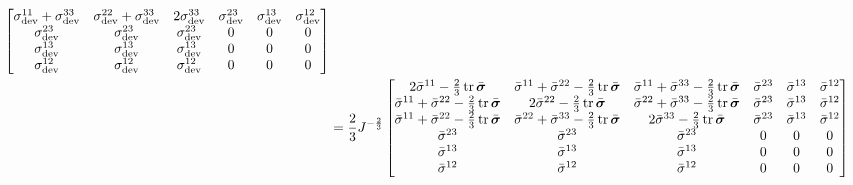 \begin{equation}
\begin{split}
\begin{bmatrix}
      \sigma_{\devop}^{11}+\sigma_{\devop}^{33} & \sigma_{\devop}^{22}+\sigma_{\devop}^{33} &
      2\sigma_{\devop}^{33} & \sigma_{\devop}^{23} &
      \sigma_{\devop}^{13} & \sigma_{\devop}^{12} \\
      \sigma_{\devop}^{23} & \sigma_{\devop}^{23} & \sigma_{\devop}^{23} & 0 &
      0 & 0 \\
      \sigma_{\devop}^{13} & \sigma_{\devop}^{13} & \sigma_{\devop}^{13} & 0 &
      0 & 0 \\
      \sigma_{\devop}^{12} & \sigma_{\devop}^{12} & \sigma_{\devop}^{12} & 0 &
      0 & 0
    \end{bmatrix} \\
    &=\dfrac{2}{3}J^{-\frac{2}{3}}\begin{bmatrix}
      2\bar{\sigma}^{11}-\frac{2}{3}\trace{}{\bar{\tensor{\sigma}}} &
      \bar{\sigma}^{11}+\bar{\sigma}^{22}-\frac{2}{3}\trace{}{\bar{\tensor{\sigma}}}
      &\bar{\sigma}^{11}+\bar{\sigma}^{33}-\frac{2}{3}\trace{}{\bar{\tensor{\sigma}}}
      & \bar{\sigma}^{23}& \bar{\sigma}^{13}& \bar{\sigma}^{12}\\
      \bar{\sigma}^{11}+\bar{\sigma}^{22}-\frac{2}{3}\trace{}{\bar{\tensor{\sigma}}} &
      2\bar{\sigma}^{22}-\frac{2}{3}\trace{}{\bar{\tensor{\sigma}}}
      &\bar{\sigma}^{22}+\bar{\sigma}^{33}-\frac{2}{3}\trace{}{\bar{\tensor{\sigma}}}
      & \bar{\sigma}^{23}& \bar{\sigma}^{13}& \bar{\sigma}^{12}\\
      \bar{\sigma}^{11}+\bar{\sigma}^{22}-\frac{2}{3}\trace{}{\bar{\tensor{\sigma}}} &
      \bar{\sigma}^{22}+\bar{\sigma}^{33}-\frac{2}{3}\trace{}{\bar{\tensor{\sigma}}}
      &2\bar{\sigma}^{33}-\frac{2}{3}\trace{}{\bar{\tensor{\sigma}}}
      & \bar{\sigma}^{23}& \bar{\sigma}^{13}& \bar{\sigma}^{12}\\     
      \bar{\sigma}^{23} & \bar{\sigma}^{23} & \bar{\sigma}^{23} & 0 & 0 & 0\\
      \bar{\sigma}^{13} & \bar{\sigma}^{13} & \bar{\sigma}^{13} & 0 & 0 & 0\\
      \bar{\sigma}^{12} & \bar{\sigma}^{12} & \bar{\sigma}^{12} & 0 & 0 & 0
    \end{bmatrix}
  \end{split}
\end{equation}

